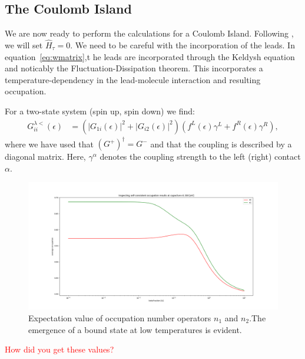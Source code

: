\documentclass{article}
\begin{document}
\begin{multicols}{2}

    \section{The Coulomb Island}\label{sec:island}
        We are now ready to perform the calculations for a Coulomb Island. Following \citet{haugjauho}, we will set $\hat{H}_\tau = 0$. We need to be careful with the incorporation of the leads. In equation~\ref{eq:wmatrix},t he leads are incorporated through the Keldysh equation and noticably the Fluctuation-Dissipation theorem. This incorporates a temperature-dependency in the lead-molecule interaction and resulting occupation.
        
        For a two-state system (spin up, spin down) we find:
        \begin{align*}
            G^{\lambda<}_{ii}(\epsilon) &= \left(\left|G_{1i}(\epsilon)\right|^2 + \left|G_{i2}(\epsilon)\right|^2 \right)\left(f^L (\epsilon) \gamma^L+f^R (\epsilon) \gamma^R\right),
        \end{align*}
        where we have used that $(G^+)^\dagger=G^-$ and that the coupling is described by a diagonal matrix. Here, $\gamma^\alpha$ denotes the coupling strength to the left (right) contact $\alpha$.
        
        \begin{figure}[b]
            \centering
            \includegraphics[width=\textwidth]{fig/figure_1.png}
            \caption{\label{fig:numberoperators}Expectation value of occupation number operators $n_1$ and $n_2$.The emergence of a bound state at low temperatures is evident.}
        \end{figure}
         
        \textcolor{red}{How did you get these values?}
        

\end{multicols}
\end{document}
